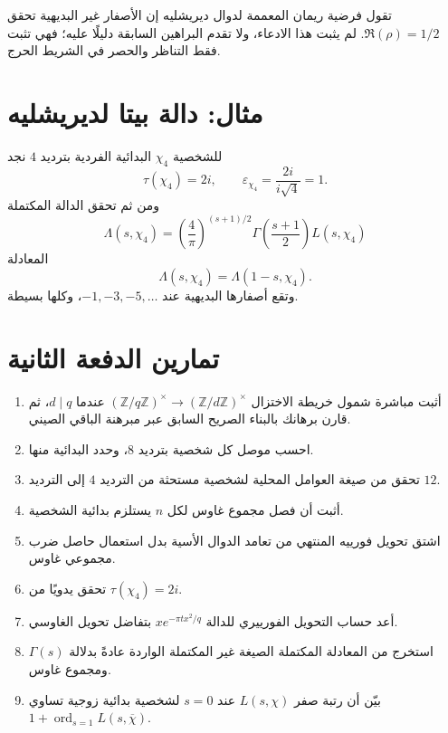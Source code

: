 \begin{remark}
تقول فرضية ريمان المعممة لدوال ديريشليه إن الأصفار غير البديهية تحقق
\(\Re(\rho)=1/2\). لم يثبت هذا الادعاء، ولا تقدم البراهين السابقة دليلًا
عليه؛ فهي تثبت فقط التناظر والحصر في الشريط الحرج.
\end{remark}

\section{مثال: دالة بيتا لديريشليه}

للشخصية \(\chi_4\) البدائية الفردية بترديد \(4\) نجد
\[
\tau(\chi_4)=2i,
\qquad
\varepsilon_{\chi_4}
=
\frac{2i}{i\sqrt4}=1.
\]
ومن ثم تحقق الدالة المكتملة
\[
\Lambda(s,\chi_4)
=
\left(\frac4\pi\right)^{(s+1)/2}
\Gamma\!\left(\frac{s+1}{2}\right)L(s,\chi_4)
\]
المعادلة
\[
\Lambda(s,\chi_4)=\Lambda(1-s,\chi_4).
\]
وتقع أصفارها البديهية عند
\(-1,-3,-5,\ldots\)، وكلها بسيطة.

\section{تمارين الدفعة الثانية}

\begin{enumerate}
  \item أثبت مباشرة شمول خريطة الاختزال
  \((\mathbb Z/q\mathbb Z)^{\times}\to
  (\mathbb Z/d\mathbb Z)^{\times}\) عندما \(d\mid q\)، ثم قارن برهانك
  بالبناء الصريح السابق عبر مبرهنة الباقي الصيني.
  \item احسب موصل كل شخصية بترديد \(8\)، وحدد البدائية منها.
  \item تحقق من صيغة العوامل المحلية لشخصية مستحثة من الترديد \(4\) إلى
  الترديد \(12\).
  \item أثبت أن فصل مجموع غاوس لكل \(n\) يستلزم بدائية الشخصية.
  \item اشتق تحويل فورييه المنتهي من تعامد الدوال الأسية بدل استعمال
  حاصل ضرب مجموعي غاوس.
  \item تحقق يدويًا من \(\tau(\chi_4)=2i\).
  \item أعد حساب التحويل الفورييري للدالة
  \(x e^{-\pi tx^2/q}\) بتفاضل تحويل الغاوسي.
  \item استخرج من المعادلة المكتملة الصيغة غير المكتملة الواردة عادةً
  بدلالة \(\Gamma(s)\) ومجموع غاوس.
  \item بيّن أن رتبة صفر \(L(s,\chi)\) عند \(s=0\) لشخصية بدائية زوجية
  تساوي \(1+\operatorname{ord}_{s=1}L(s,\overline\chi)\).
\end{enumerate}

